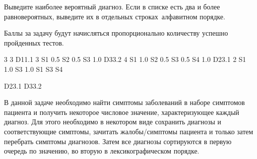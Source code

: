 \outputfmtSection

Выведите наиболее вероятный диагноз. Если в списке есть два и более равновероятных, выведите их в отдельных строках алфавитном порядке.

\markSection

Баллы за задачу будут начисляться пропорционально количеству успешно пройденных тестов.


\begin{myverbbox}[\small]{\vinput}
    3 3
    D11.1 3
    S1 0.5
    S2 0.5
    S3 1.0
    D33.2 4
    S1 1.0
    S2 0.5
    S3 0.5
    S4 1.0
    D23.1 2
    S1 1.0
    S3 1.0
    S1 S3 S4
\end{myverbbox}
\begin{myverbbox}[\small]{\voutput}
    D23.1
    D33.2
\end{myverbbox}

\solutionSection

В данной задаче необходимо найти симптомы заболеваний в наборе симптомов пациента и получить некоторое числовое значение, характеризующее каждый диагноз. Для этого необходимо в некотором виде сохранить диагнозы и соответствующие симптомы, зачитать жалобы/симптомы пациента и только затем перебрать симптомы диагнозов. Затем все диагнозы сортируются в первую очередь по значению, во вторую в лексикографическом порядке.
